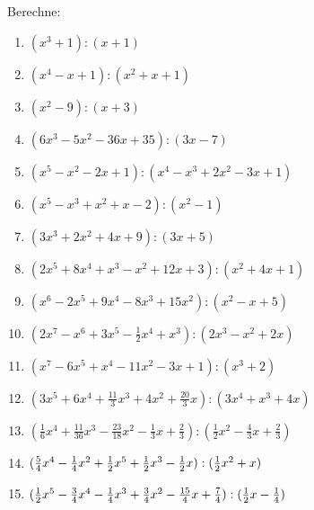 		Berechne:
		\begin{enumerate}
			\item $(x^3+1):(x+1)$
			\item $(x^4-x+1):(x^2+x+1)$
			\item $(x^2-9):(x+3)$
			\item $(6x^3-5x^2-36x+35):(3x-7)$
			\item $(x^5-x^2-2x+1) : (x^4-x^3+2x^2-3x+1)$
			\item $(x^5-x^3+x^2+x-2) : (x^2-1)$
			\item $(3x^3+2x^2+4x+9) : (3x+5)$
			\item $(2x^5 + 8x^4 +x^3-x^2 + 12 x +3): (x^2+4x+1)$
			\item $(x^6-2x^5+9x^4-8x^3+15x^2):(x^2-x+5)$
			\item $(2x^7 - x^6 + 3x^5 - \tfrac{1}{2}x^4 + x^3) : (2x^3 - x^2 + 2x)$
			\item $(x^7-6x^5+x^4-11x^2-3x+1):(x^3+2)$
			\item $(3x^5 +6x^4 +\tfrac{11}{3}x^3 + 4x^2 + \tfrac{20}{3}x):(3x^4 +x^3+4x)$
			\item $(\tfrac{1}{6}x^4 + \tfrac{11}{36}x^3 - \tfrac{23}{18}x^2 -
			\tfrac{1}{3}x + \tfrac{2}{3}) : (\tfrac{1}{2}x^2 - \tfrac{4}{3}x +
			\tfrac{2}{3})$
			\item $(\tfrac{5}{4}x^4- \tfrac{1}{4}x^2  + \tfrac{1}{2} x^5 + \tfrac{1}{2} x^3 -\tfrac{1}{2} x)
			: (\tfrac{1}{2} x^2 +x)$
			\item $(\tfrac{1}{2} x^5 - \tfrac{3}{4}x^4 - \tfrac{1}{4}x^3 + \tfrac{3}{4}x^2 -
			\tfrac{15}{4}x + \tfrac{7}{4}) : (\tfrac{1}{2} x -\tfrac{1}{4})$
		\end{enumerate}
\vspace{-2em}
\nopagebreak[4]